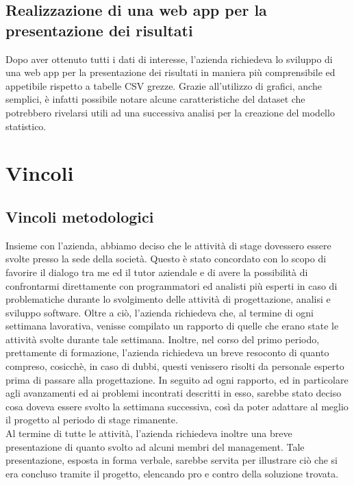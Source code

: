 \subsection{Realizzazione di una web app per la presentazione dei risultati}
Dopo aver ottenuto tutti i dati di interesse, l'azienda richiedeva lo sviluppo di una \gls{web app} per la presentazione dei risultati in maniera più comprensibile ed appetibile rispetto a tabelle CSV grezze. Grazie all'utilizzo di grafici, anche semplici, è infatti possibile notare alcune caratteristiche del dataset che potrebbero rivelarsi utili ad una successiva analisi per la creazione del modello statistico.
\section{Vincoli}
\subsection{Vincoli metodologici}
Insieme con l'azienda, abbiamo deciso che le attività di stage dovessero essere svolte presso la sede della società. Questo è stato concordato con lo scopo di favorire il dialogo tra me ed il tutor aziendale e di avere la possibilità di confrontarmi direttamente con programmatori ed analisti più esperti in caso di problematiche durante lo svolgimento delle attività di progettazione, analisi e sviluppo software.
Oltre a ciò, l’azienda richiedeva che, al termine di ogni settimana lavorativa, venisse compilato un rapporto di quelle che erano state le attività svolte durante tale settimana. Inoltre, nel corso del primo periodo, prettamente di formazione, l'azienda richiedeva un breve resoconto di quanto compreso, cosicchè, in caso di dubbi, questi venissero risolti da personale esperto prima di passare alla progettazione.
In seguito ad ogni rapporto, ed in particolare agli avanzamenti ed ai problemi incontrati descritti in esso, sarebbe stato deciso cosa doveva essere svolto la settimana successiva, così da poter adattare al meglio il progetto al periodo di stage rimanente.\\
Al termine di tutte le attività, l'azienda richiedeva inoltre una breve presentazione di quanto svolto ad alcuni membri del management. Tale presentazione, esposta in forma verbale, sarebbe servita per illustrare ciò che si era concluso tramite il progetto, elencando pro e contro della soluzione trovata.
